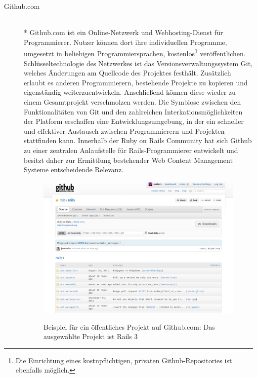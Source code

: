 \begin{description}
\newpage
\item[Github.com]\mbox{~}\\*
Github.com ist ein Online-Netzwerk und Webhosting-Dienst für Programmierer. Nutzer können dort ihre individuellen Programme, umgesetzt in beliebigen Programmiersprachen, kostenlos\footnote{Die Einrichtung eines kostnpflichtigen, privaten Github-Repositories ist ebenfalls möglich.}  veröffentlichen.
Schlüsseltechnologie des Netzwerkes ist das Versionsverwaltungssystem Git, welches Änderungen am Quellcode des Projektes festhält. Zusätzlich erlaubt es anderen Programmierern, bestehende Projekte zu kopieren und eigenständig weiterzuentwickeln. Anschließend können diese wieder zu einem Gesamtprojekt verschmolzen werden.
Die Symbiose zwischen den Funktionalitäten von Git und den zahlreichen Interkationsmöglichkeiten der Platform erschaffen eine Entwicklungsumgebung, in der ein schneller und effektiver Austausch zwischen Programmierern und Projekten stattfinden kann.
Innerhalb der Ruby on Rails Community hat sich Github zu einer zentralen Anlaufstelle für Rails-Programmierer entwickelt und besitzt daher zur Ermittlung bestehender Web Content Management Systeme entscheidende Relevanz.
\begin{figure}[!h]
\begin{center}
\label{fig.github}
\includegraphics[scale=0.3]{images/analyse/github/github.png}
\caption{Beispiel für ein öffentliches Projekt auf Github.com: Das ausgewählte Projekt ist Rails 3}
\end{center}
\end{figure}
\end{description}

\newpage
